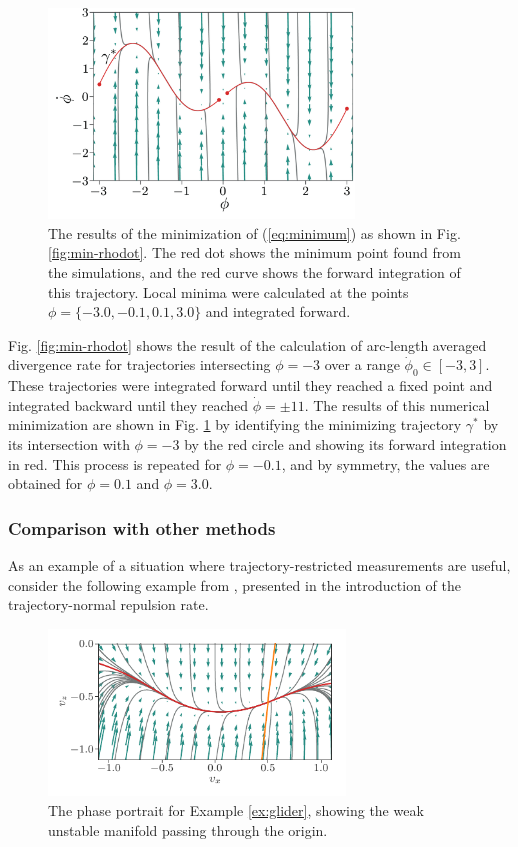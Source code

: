 \documentclass[twocolumn]{svjour3}
\begin{document}
\begin{figure}
	\centering
	\includegraphics[width=3.2in]{Fig11}
	\caption{The results of the minimization of (\ref{eq:minimum}) as shown in Fig. \ref{fig:min-rhodot}. The red dot shows the minimum point found from the simulations, and the red curve shows the forward integration of this trajectory. Local minima were calculated at the points $\phi=\{-3.0, -0.1, 0.1, 3.0\}$ and integrated forward.}
	\label{fig:min-rhodot-comp}
\end{figure}

Fig. \ref{fig:min-rhodot} shows the result of the calculation of arc-length averaged divergence rate for trajectories intersecting $\phi=-3$ over a range $\dot{\phi}_0\in[-3, 3]$. These trajectories were integrated forward until they reached a fixed point and integrated backward until they reached $\dot{\phi}=\pm11$. The results of this numerical minimization are shown in Fig. \ref{fig:min-rhodot-comp} by identifying the minimizing trajectory $\gamma^*$ by its intersection with $\phi=-3$ by the red circle and showing its forward integration in red. This process is repeated for $\phi=-0.1$, and by symmetry, the values are obtained for $\phi=0.1$ and $\phi=3.0$.

\subsubsection{Comparison with other methods}
As an example of a situation where trajectory-restricted measurements are useful, consider the following example from \cite{haller_variational_2011}, presented in the introduction of the trajectory-normal repulsion rate.

\begin{figure}
\centering
\includegraphics[width=3.1in]{Fig12}
\caption{The phase portrait for Example \ref{ex:glider}, showing the weak unstable manifold passing through the origin.}
\label{fig:glider}
\end{figure}
\end{document}
